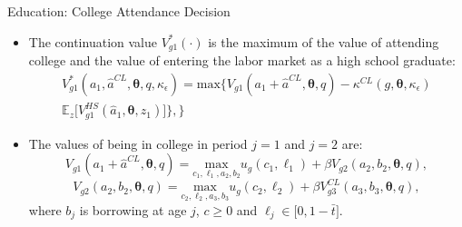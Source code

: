 \documentclass{beamer}
\begin{document}
\begin{frame}{Education: College Attendance Decision}
\begin{itemize}
  \item The continuation value $V^{*}_{g1}(\cdot)$ is the maximum of the value of attending college and 		the value of entering the labor market as a high school graduate:
    	\begin{equation*}
  		\begin{aligned}
  		V^{*}_{g1}(a_1,\hat{a}^{CL},\boldsymbol{\theta},q,\kappa_{\epsilon}) = \mathrm{max}\big\{V_{g1}			(a_1+\hat{a}^{CL},\boldsymbol{\theta},q)-\kappa^{CL}(g,\boldsymbol{\theta},\kappa_{\epsilon}) \\ 		 \mathbb{E}_{z}\big[V^{HS}_{g1}(\hat{a}_1,\boldsymbol{\theta},z_1)\big]\big\},\big\}
        \end{aligned}
        \end{equation*}
  \item The values of being in college in period $j=1$ and $j=2$ are:      
  		$$V_{g1}(a_1+\hat{a}^{CL},\boldsymbol{\theta},q) = \underset{c_1,\ell_1,a_2,b_2}						{\mathrm{max}}u_g(c_1,\ell_1)+\beta{V}_{g2}(a_2,b_2,\boldsymbol{\theta},q),$$
        $$V_{g2}(a_2,b_2,\boldsymbol{\theta},q) = \underset{c_2,\ell_2,a_3,b_3}{\mathrm{max}}u_g(c_2,			\ell_2)+\beta{V}^{CL}_{g3}(a_3,b_3,\boldsymbol{\theta},q),$$
        where $b_j$ is borrowing at age $j$, $c\geq0$ and $\ell_j\in\big[0,1-\bar{t}\big]$.      
\end{itemize}      
\end{frame} 
\end{document}
